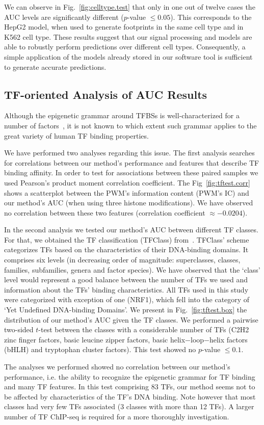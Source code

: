 \documentclass{bioinfo}
\begin{document}
We can observe in Fig.~\ref{fig:celltype.test} that only in one out of twelve cases
the AUC levels are significantly different ($p$-value $\leq 0.05$). This corresponds
to the HepG2 model, when used to generate footprints in the same cell type and
in K562 cell type. These results suggest that our signal processing and models are
able to robustly perform predictions over different cell types. Consequently, a simple application of
the models already stored in our software tool is sufficient to generate accurate predictions. 

{\color{black}
\subsection{TF-oriented Analysis of AUC Results}
\label{sec:hmm.tf.test}

Although the epigenetic grammar around TFBSs is well-characterized for
a number of factors~\cite{encode2012,neph2012a}, it is not known to which
extent such grammar applies to the great variety of human TF binding properties. 

We have performed two analyses regarding this issue. The first analysis
searches for correlations between our method's performance and features
that describe TF binding affinity. In order to test for associations between
these paired samples we used Pearson's product moment correlation coefficient.
The Fig~\ref{fig:tftest.corr} shows a scatterplot between the PWM's information content
(PWM's IC) and our method's AUC (when using three histone modifications). We have observed
no correlation between these two features (correlation coefficient $\approx −0.0204$).

In the second analysis we tested our method's AUC between different 
TF classes. For that, we obtained the TF classification (TFClass)
from~\cite{wingender2013}. TFClass' scheme categorizes TFs based on the
characteristics of their DNA-binding domains. It comprises six levels
(in decreasing order of magnitude: superclasses, classes, families,
subfamilies, genera and factor species). We have observed that the `class' level
would represent a good balance between the number of TFs we used and
information about the TFs' binding characteristics. All TFs used in this
study were categorized with exception of one (NRF1), which fell into
the category of `Yet Undefined DNA-binding Domains'. We present in
Fig.~\ref{fig:tftest.box} the distribution of our method's AUC given the TF
classes. We performed a pairwise two-sided $t$-test between the classes
with a considerable number of TFs (C2H2 zinc finger factors, basic
leucine zipper factors, basic helix−loop−helix factors (bHLH) and
tryptophan cluster factors). This test showed no $p$-value $\leq 0.1$.

The analyses we performed showed no correlation between our method's
performance, i.e. the ability to recognize the epigenetic grammar for
TF binding and many TF features. In this test comprising 83 TFs, our method
seems not to be affected by characteristics of the TF's DNA binding.
Note however that most classes had very few TFs associated (3 classes
with more than 12 TFs). A larger number of TF ChIP-seq is required for
a more thoroughly investigation.
}
\end{document}

